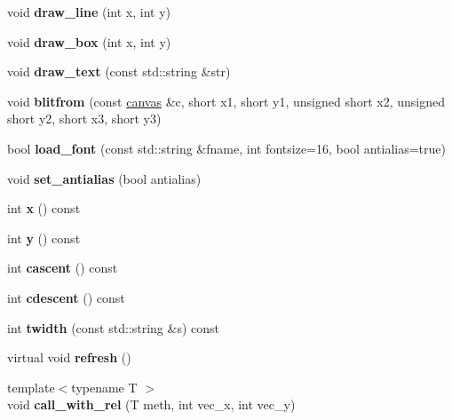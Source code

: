 \begin{DoxyCompactItemize}
void {\bfseries draw\+\_\+line} (int x, int y)
\item 
\mbox{\label{classgenv_1_1canvas_aea31b05cd41534691b329bd1545eeb84}} 
void {\bfseries draw\+\_\+box} (int x, int y)
\item 
\mbox{\label{classgenv_1_1canvas_a6c6b77a47bde4163919ad44dfa6e0638}} 
void {\bfseries draw\+\_\+text} (const std\+::string \&str)
\item 
\mbox{\label{classgenv_1_1canvas_a94bad016a557ab62c7019ca25647bc0c}} 
void {\bfseries blitfrom} (const \hyperlink{classgenv_1_1canvas}{canvas} \&c, short x1, short y1, unsigned short x2, unsigned short y2, short x3, short y3)
\item 
\mbox{\label{classgenv_1_1canvas_a8ecb2e0d7f15f8a4875e04f747762a13}} 
bool {\bfseries load\+\_\+font} (const std\+::string \&fname, int fontsize=16, bool antialias=true)
\item 
\mbox{\label{classgenv_1_1canvas_ad57cbfa2d960d827e5f689c508255254}} 
void {\bfseries set\+\_\+antialias} (bool antialias)
\item 
\mbox{\label{classgenv_1_1canvas_ad220ddfad4b67f2e24e2699e2ad7f91e}} 
int {\bfseries x} () const
\item 
\mbox{\label{classgenv_1_1canvas_a56c80674a756a69f09c0ce63bf17402d}} 
int {\bfseries y} () const
\item 
\mbox{\label{classgenv_1_1canvas_a21c0c57177ee0e47eb444a6bae8b7da5}} 
int {\bfseries cascent} () const
\item 
\mbox{\label{classgenv_1_1canvas_ae90f845816ac7045be771cca107f6f73}} 
int {\bfseries cdescent} () const
\item 
\mbox{\label{classgenv_1_1canvas_a79b09f2fa46b713164ddc326fb5c7c31}} 
int {\bfseries twidth} (const std\+::string \&s) const
\item 
\mbox{\label{classgenv_1_1canvas_a04bc3204672ade4baa0a13a10a43d9e2}} 
virtual void {\bfseries refresh} ()
\item 
\mbox{\label{classgenv_1_1canvas_a6a4a48ca686c16460d0c42e9d8c2ea3c}} 
{\footnotesize template$<$typename T $>$ }\\void {\bfseries call\+\_\+with\+\_\+rel} (T meth, int vec\+\_\+x, int vec\+\_\+y)
\end{DoxyCompactItemize}
